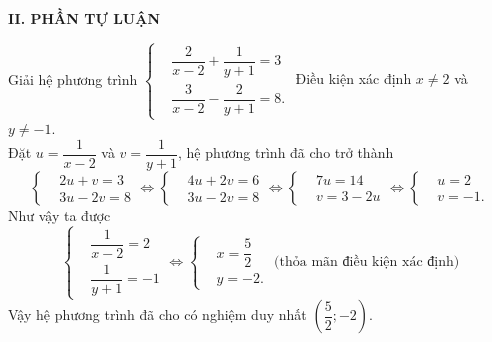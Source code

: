 \noindent\textbf{II. PHẦN TỰ LUẬN}
\setcounter{ex}{0}
\begin{ex}%
 Giải hệ phương trình $
  \left\{\begin{aligned} & \dfrac{2}{x-2}+\dfrac{1}{y+1}=3 \\& \dfrac{3}{x-2}-\dfrac{2}{y+1}=8.\end{aligned}\right. $
 \loigiai
  {
  Điều kiện xác định $x \neq 2$ và $y \neq -1$.\\
  Đặt $u=\dfrac{1}{x-2}$ và $v=\dfrac{1}{y+1}$, hệ phương trình đã cho trở thành
  \begin{equation*}
   					\left\{\begin{aligned} & 2u+v=3 \\& 3u-2v=8 \end{aligned}\right.
   \Leftrightarrow  \left\{\begin{aligned} & 4u+2v=6 \\& 3u-2v=8\end{aligned}\right.
   \Leftrightarrow  \left\{\begin{aligned} & 7u=14 \\& v=3-2u\end{aligned}\right.
   \Leftrightarrow  \left\{\begin{aligned} & u=2 \\& v=-1.\end{aligned}\right.
  \end{equation*}
  Như vậy ta được
  \begin{equation*}
    \left\{\begin{aligned} & \dfrac{1}{x-2}=2 \\& \dfrac{1}{y+1}=-1\end{aligned}\right. \Leftrightarrow \left\{\begin{aligned} & x=\dfrac{5}{2} \\& y=-2.\end{aligned}\right. \text{ (thỏa mãn điều kiện xác định)}
  \end{equation*}
  Vậy hệ phương trình đã cho có nghiệm duy nhất $\left(\dfrac{5}{2};-2\right)$.
  }
\end{ex}

